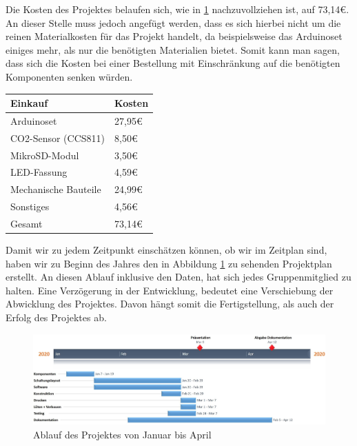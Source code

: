 \label{KostenundArbeitsplan}

Die Kosten des Projektes belaufen sich, wie in \ref{tab:Kosten} nachzuvollziehen ist, auf 73,14€. An dieser Stelle muss jedoch angefügt werden, dass es sich hierbei nicht um die reinen Materialkosten für das Projekt handelt, da beispielsweise das Arduinoset einiges mehr, als nur die benötigten Materialien bietet. Somit kann man sagen, dass sich die Kosten bei einer Bestellung mit Einschränkung auf die benötigten Komponenten senken würden.

\begin{table}[!hbt]
	
	\centering
	
	\begin{tabular}{|p{8cm}|p{8cm}|}
		
		\hline
		\rowcolor{lightgray} Einkauf & Kosten \\
		\hline
		Arduinoset & 27,95€ \\
		\hline
		CO2-Sensor (CCS811) & 8,50€ \\
		\hline
		MikroSD-Modul & 3,50€ \\
		\hline
		LED-Fassung & 4,59€ \\
		\hline
		Mechanische Bauteile & 24,99€ \\
		\hline
		Sonstiges & 4,56€ \\
		\hline
		\rowcolor{lightgray} Gesamt & 73,14€ \\
		\hline
		
	\end{tabular}
	
	\label{tab:Kosten}
	
\end{table}

Damit wir zu jedem Zeitpunkt einschätzen können, ob wir im Zeitplan sind, haben wir zu Beginn des Jahres den in Abbildung \ref{fig:Ablaufplan} zu sehenden Projektplan erstellt. An diesen Ablauf inklusive den Daten, hat sich jedes Gruppenmitglied zu halten. Eine Verzögerung in der Entwicklung, bedeutet eine Verschiebung der Abwicklung des Projektes. Davon hängt somit die Fertigstellung, als auch der Erfolg des Projektes ab.

\begin{figure}[!hbt]
	\centering
	\includegraphics[width=1\linewidth]{Images/Ablaufplan}
	\caption{Ablauf des Projektes von Januar bis April}
	\label{fig:Ablaufplan}
\end{figure}


